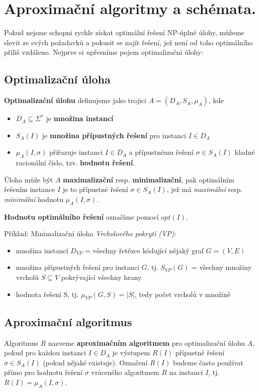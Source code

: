 \documentclass[11pt]{report} %
\numberwithin{equation}{section}
\begin{document}
\section{Aproximační algoritmy a schémata.}
Pokud nejsme schopni rychle získat optimální řešení NP-úplné úlohy, můžeme slevit ze svých požadavků a pokusit se najít řešení, jež není od toho optimálního příliš vzdáleno. Nejprve si upřesníme pojem optimalizační úlohy:

\subsection{Optimalizační úloha}
\textbf{Optimalizační úlohu} definujeme jako trojici $A = (D_A, S_A, \mu_A)$, kde
\begin{itemize}
	
	
	\item $D_A \subseteq \Sigma^*$ je \textbf{množina instancí}
	\item $S_A(I)$ je \textbf{množina přípustných řešení} pro instanci $I \in D_A$
	\item $\mu_A(I, \sigma)$ přiřazuje instanci $I \in D_A$ a přípustnému řešení  $\sigma \in S_A(I)$ kladné racionální číslo, tzv. \textbf{hodnotu řešení}.
\end{itemize}

Úloha může být $A$ \textbf{maximalizační} resp. \textbf{minimalizační}, pak optimálním řešením instance $I$ je to přípustné řešení $\sigma \in S_A(I)$, jež má \textit{maximální} resp. \textit{minimální} hodnotu $\mu_A(I, \sigma)$.

\textbf{Hodnotu optimálního řešení} označíme pomocí $opt(I)$.

Příklad: Minimalizační úloha \textit{Vrcholového pokrytí (VP)}: 
\begin{itemize}
	
	
	\item množina instancí $D_{VP}$ = všechny řetězce kódující nějaký graf $G = (V,E)$	
	\item množina přípustných řešení pro instanci $G$, tj. $S_{VP}(G)$ = všechny množiny vrcholů $S \subseteq V$ pokrývající všechny hrany
	\item hodnota řešení S, tj. $\mu_{VP}(G,S) = |S|$, tedy počet vrcholů v množině
\end{itemize}

\subsection{Aproximační algoritmus}
Algoritmus $R$ nazveme \textbf{aproximačním algoritmem} pro optimalizační úlohu $A$, pokud pro každou instanci $I \in D_A$ je výstupem $R(I)$ přípustné řešení $\sigma \in S_A(I)$ (pokud nějaké existuje). Označení $R(I)$ budeme často používat přímo pro hodnotu řešení $\sigma$ vráceného algoritmem $R$ na instanci $I$, tj. $R(I) = \mu_A(I, \sigma)$.
\end{document}
